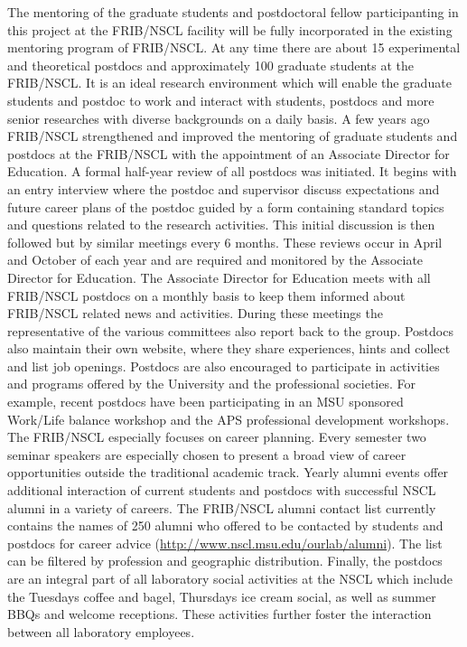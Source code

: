 \documentclass[10pt]{article}
\begin{document}
The mentoring of the graduate students and postdoctoral fellow 
participanting in this project at the 
FRIB/NSCL facility will be fully incorporated in the existing
mentoring program of FRIB/NSCL. At any time there are about 15
experimental and theoretical postdocs and approximately 100 graduate
students at the FRIB/NSCL. It is an ideal research environment which
will enable the graduate students and postdoc to work and interact
with students, postdocs and more senior researches with diverse
backgrounds on a daily basis. A few years ago FRIB/NSCL strengthened
and improved the mentoring of graduate students and postdocs at the
FRIB/NSCL with the appointment of an Associate Director for
Education. A formal half-year review of all postdocs was initiated. It
begins with an entry interview where the postdoc and supervisor
discuss expectations and future career plans of the postdoc guided by
a form containing standard topics and questions related to the
research activities. This initial discussion is then followed but by
similar meetings every 6 months. These reviews occur in April and
October of each year and are required and monitored by the Associate
Director for Education.  The Associate Director for Education meets
with all FRIB/NSCL postdocs on a monthly basis to keep them informed
about FRIB/NSCL related news and activities. During these meetings the
representative of the various committees also report back to the
group. Postdocs also maintain their own website, where they share
experiences, hints and collect and list job openings. Postdocs are
also encouraged to participate in activities and programs offered by
the University and the professional societies. For example, recent
postdocs have been participating in an MSU sponsored Work/Life balance
workshop and the APS professional development workshops. The FRIB/NSCL
especially focuses on career planning. Every semester two seminar
speakers are especially chosen to present a broad view of career
opportunities outside the traditional academic track. Yearly alumni
events offer additional interaction of current students and postdocs
with successful NSCL alumni in a variety of careers.  The FRIB/NSCL
alumni contact list currently contains the names of 250 alumni who
offered to be contacted by students and postdocs for career advice
(\url{http://www.nscl.msu.edu/ourlab/alumni}).  The list can be
filtered by profession and geographic distribution.  Finally, the
postdocs are an integral part of all laboratory social activities at
the NSCL which include the Tuesdays coffee and bagel, Thursdays ice
cream social, as well as summer BBQs and welcome receptions. These
activities further foster the interaction between all laboratory
employees.
\end{document}
